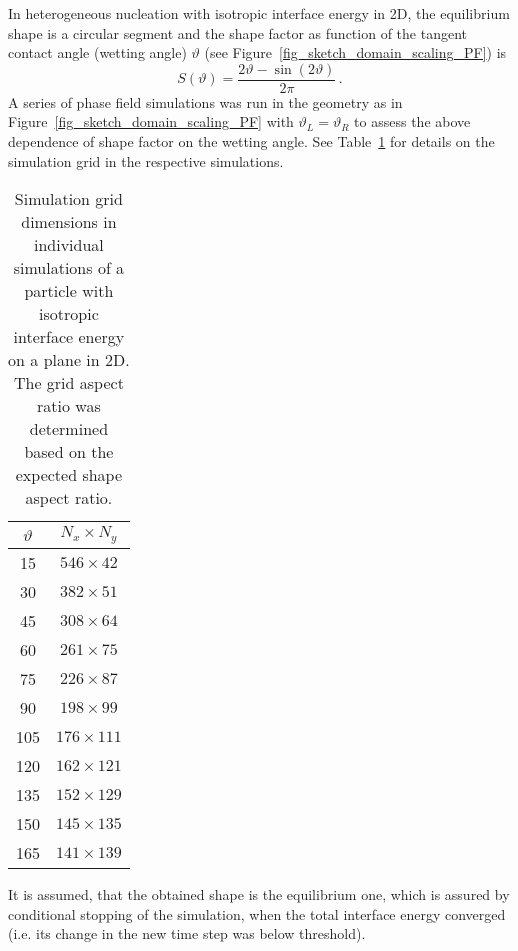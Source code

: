 	In heterogeneous nucleation with isotropic interface energy in 2D, the equilibrium shape is a circular segment and the shape factor as function of the tangent contact angle (wetting angle) $\vartheta$ (see Figure~\ref{fig_sketch_domain_scaling_PF}) is
	\begin{equation}
		S(\vartheta) = \frac{2\vartheta - \sin(2\vartheta)}{2\pi} \,.
	\end{equation}
	A series of phase field simulations was run in the geometry as in Figure~\ref{fig_sketch_domain_scaling_PF} with $\vartheta_L=\vartheta_R$ to assess the above dependence of shape factor on the wetting angle. See Table~\ref{tab_PF_NPA_param_particle_onplane} for details on the simulation grid in the respective simulations.
	\begin{table}
		\centering
		\caption[PF wetting simulation of a particle with isotropic interface energy - simulation grid dimensions]{Simulation grid dimensions in individual simulations of a particle with isotropic interface energy on a plane in 2D. The grid aspect ratio was determined based on the expected shape aspect ratio.}
		\label{tab_PF_NPA_param_particle_onplane}
		\begin{tabular}{c|c}
			$\vartheta$ & $N_x\times N_y$ \\ \hline
			15	&	$546\times 42$	\\
			30	&	$382\times 51$	\\
			45	&	$308\times 64$	\\
			60	&	$261\times 75$	\\
			75	&	$226\times 87$	\\
			90	&	$198\times 99$	\\
			105	&	$176\times 111$	\\
			120	&	$162\times 121$	\\
			135	&	$152\times 129$	\\
			150	&	$145\times 135$	\\
			165	&	$141\times 139$	
		\end{tabular}
	\end{table}
	It is assumed, that the obtained shape is the equilibrium one, which is assured by conditional stopping of the simulation, when the total interface energy converged (i.e. its change in the new time step was below threshold). 
	
